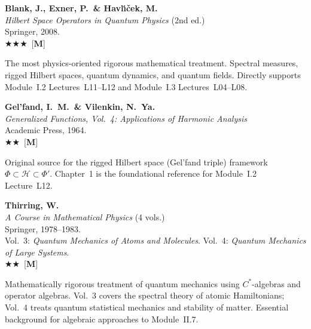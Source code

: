 \documentclass[11pt,a4paper]{article}
\newcommand{\essential}{$\bigstar\bigstar\bigstar$}
\newcommand{\recommended}{$\bigstar\bigstar$}
\newenvironment{bibentry}[1]{\begin{tcolorbox}[entrybox=#1,top=4pt,bottom=4pt]}{\end{tcolorbox}\smallskip}
\begin{document}
\begin{bibentry}{t5light}
\textbf{Blank, J., Exner, P.\ \& Havl\'{\i}\v{c}ek, M.}\\
\textit{Hilbert Space Operators in Quantum Physics} (2nd ed.)\\
Springer, 2008.\\[3pt]
\essential\ [\textbf{M}]\\[3pt]
\begin{tcolorbox}[annotbox]
The most physics-oriented rigorous mathematical treatment. Spectral measures,
rigged Hilbert spaces, quantum dynamics, and quantum fields. Directly supports
Module~I.2 Lectures~L11--L12 and Module~I.3 Lectures~L04--L08.
\end{tcolorbox}
\end{bibentry}

\begin{bibentry}{t5light}
\textbf{Gel'fand, I.~M.\ \& Vilenkin, N.~Ya.}\\
\textit{Generalized Functions, Vol.~4: Applications of Harmonic Analysis}\\
Academic Press, 1964.\\[3pt]
\recommended\ [\textbf{M}]\\[3pt]
\begin{tcolorbox}[annotbox]
Original source for the rigged Hilbert space (Gel'fand triple) framework
$\Phi\subset\mathcal{H}\subset\Phi'$. Chapter~1 is the foundational reference for
Module~I.2 Lecture~L12.
\end{tcolorbox}
\end{bibentry}

\begin{bibentry}{t5light}
\textbf{Thirring, W.}\\
\textit{A Course in Mathematical Physics} (4 vols.)\\
Springer, 1978--1983.\\
Vol.~3: \textit{Quantum Mechanics of Atoms and Molecules}. Vol.~4: \textit{Quantum Mechanics of Large Systems}.\\[3pt]
\recommended\ [\textbf{M}]\\[3pt]
\begin{tcolorbox}[annotbox]
Mathematically rigorous treatment of quantum mechanics using $C^*$-algebras and
operator algebras. Vol.~3 covers the spectral theory of atomic Hamiltonians;
Vol.~4 treats quantum statistical mechanics and stability of matter. Essential
background for algebraic approaches to Module~II.7.
\end{tcolorbox}
\end{bibentry}
\end{document}

